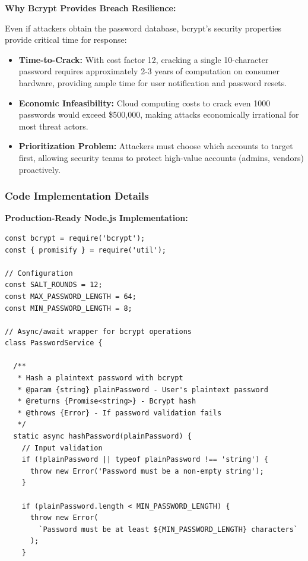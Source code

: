 \documentclass[12pt,a4paper]{article}
\begin{document}
\begin{tcolorbox}[colback=primaryblue!5, colframe=primaryblue, boxrule=1pt, arc=3pt, left=10pt, right=10pt, top=8pt, bottom=8pt]
\vspace{0.5em}

\textbf{Why Bcrypt Provides Breach Resilience:}

Even if attackers obtain the password database, bcrypt's security properties provide critical time for response:

\begin{itemize}[leftmargin=2em, itemsep=6pt]
    \item \textbf{Time-to-Crack:} With cost factor 12, cracking a single 10-character password requires approximately 2-3 years of computation on consumer hardware, providing ample time for user notification and password resets.
    \item \textbf{Economic Infeasibility:} Cloud computing costs to crack even 1000 passwords would exceed \$500,000, making attacks economically irrational for most threat actors.
    \item \textbf{Prioritization Problem:} Attackers must choose which accounts to target first, allowing security teams to protect high-value accounts (admins, vendors) proactively.
\end{itemize}

\subsubsection{Code Implementation Details}

\textbf{Production-Ready Node.js Implementation:}

\begin{verbatim}
const bcrypt = require('bcrypt');
const { promisify } = require('util');

// Configuration
const SALT_ROUNDS = 12;
const MAX_PASSWORD_LENGTH = 64;
const MIN_PASSWORD_LENGTH = 8;

// Async/await wrapper for bcrypt operations
class PasswordService {
  
  /**
   * Hash a plaintext password with bcrypt
   * @param {string} plainPassword - User's plaintext password
   * @returns {Promise<string>} - Bcrypt hash
   * @throws {Error} - If password validation fails
   */
  static async hashPassword(plainPassword) {
    // Input validation
    if (!plainPassword || typeof plainPassword !== 'string') {
      throw new Error('Password must be a non-empty string');
    }
    
    if (plainPassword.length < MIN_PASSWORD_LENGTH) {
      throw new Error(
        `Password must be at least ${MIN_PASSWORD_LENGTH} characters`
      );
    }
    

\end{verbatim}
\end{tcolorbox}
\end{document}
